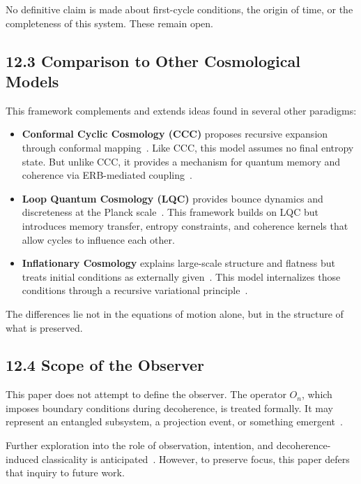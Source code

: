 No definitive claim is made about first-cycle conditions, the origin of time, or the completeness of this system. These remain open.

\subsection*{12.3 Comparison to Other Cosmological Models}

This framework complements and extends ideas found in several other paradigms:

\begin{itemize}
  \item \textbf{Conformal Cyclic Cosmology (CCC)} proposes recursive expansion through conformal mapping~\cite{penrose2010cycles}. Like CCC, this model assumes no final entropy state. But unlike CCC, it provides a mechanism for quantum memory and coherence via ERB-mediated coupling~\cite{maldacena2013cool}.
  \item \textbf{Loop Quantum Cosmology (LQC)} provides bounce dynamics and discreteness at the Planck scale~\cite{ashtekar2006quantum}. This framework builds on LQC but introduces memory transfer, entropy constraints, and coherence kernels that allow cycles to influence each other.
  \item \textbf{Inflationary Cosmology} explains large-scale structure and flatness but treats initial conditions as externally given~\cite{guth1981inflationary}. This model internalizes those conditions through a recursive variational principle~\cite{lloyd_quantum_1988}.
\end{itemize}

The differences lie not in the equations of motion alone, but in the structure of what is preserved.

\subsection*{12.4 Scope of the Observer}

This paper does not attempt to define the observer. The operator \( O_n \), which imposes boundary conditions during decoherence, is treated formally. It may represent an entangled subsystem, a projection event, or something emergent~\cite{zurek2009quantum}.

Further exploration into the role of observation, intention, and decoherence-induced classicality is anticipated~\cite{tegmark_consciousness_2015}. However, to preserve focus, this paper defers that inquiry to future work.

